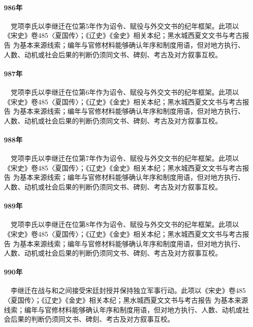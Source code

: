\paragraph{986年}　党项李氏以李继迁在位第5年作为诏令、赋役与外交文书的纪年框架。此项以《宋史》卷485〈夏国传〉；《辽史》《金史》相关本纪；黑水城西夏文文书与考古报告 为基本来源线索；编年与官修材料能够确认年序和制度用语，但对地方执行、人数、动机或社会后果的判断仍须同文书、碑刻、考古及对方叙事互校。

\paragraph{987年}　党项李氏以李继迁在位第6年作为诏令、赋役与外交文书的纪年框架。此项以《宋史》卷485〈夏国传〉；《辽史》《金史》相关本纪；黑水城西夏文文书与考古报告 为基本来源线索；编年与官修材料能够确认年序和制度用语，但对地方执行、人数、动机或社会后果的判断仍须同文书、碑刻、考古及对方叙事互校。

\paragraph{988年}　党项李氏以李继迁在位第7年作为诏令、赋役与外交文书的纪年框架。此项以《宋史》卷485〈夏国传〉；《辽史》《金史》相关本纪；黑水城西夏文文书与考古报告 为基本来源线索；编年与官修材料能够确认年序和制度用语，但对地方执行、人数、动机或社会后果的判断仍须同文书、碑刻、考古及对方叙事互校。

\paragraph{989年}　党项李氏以李继迁在位第8年作为诏令、赋役与外交文书的纪年框架。此项以《宋史》卷485〈夏国传〉；《辽史》《金史》相关本纪；黑水城西夏文文书与考古报告 为基本来源线索；编年与官修材料能够确认年序和制度用语，但对地方执行、人数、动机或社会后果的判断仍须同文书、碑刻、考古及对方叙事互校。

\paragraph{990年}　李继迁在战与和之间接受宋廷封授并保持独立军事行动。此项以《宋史》卷485〈夏国传〉；《辽史》《金史》相关本纪；黑水城西夏文文书与考古报告 为基本来源线索；编年与官修材料能够确认年序和制度用语，但对地方执行、人数、动机或社会后果的判断仍须同文书、碑刻、考古及对方叙事互校。

